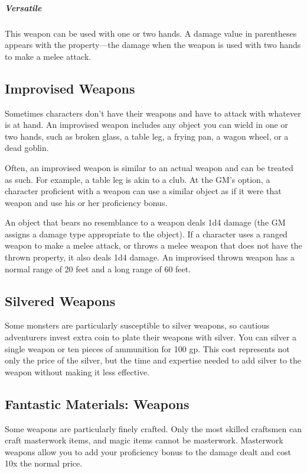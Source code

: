 \subparagraph*{Versatile} This weapon can be used with one or two hands. A damage value in parentheses appears with the property—the damage when the weapon is used with two hands to make a melee attack.

\subsection{Improvised Weapons}

Sometimes characters don't have their weapons and have to attack with whatever is at hand. An improvised weapon includes any object you can wield in one or two hands, such as broken glass, a table leg, a frying pan, a wagon wheel, or a dead goblin.

Often, an improvised weapon is similar to an actual weapon and can be treated as such. For example, a table leg is akin to a club. At the GM's option, a character proficient with a weapon can use a similar object as if it were that weapon and use his or her proficiency bonus.

An object that bears no resemblance to a weapon deals 1d4 damage (the GM assigns a damage type appropriate to the object). If a character uses a ranged weapon to make a melee attack, or throws a melee weapon that does not have the thrown property, it also deals 1d4 damage. An improvised thrown weapon has a normal range of 20 feet and a long range of 60 feet.

\subsection{Silvered Weapons}

Some monsters are particularly susceptible to silver weapons, so cautious adventurers invest extra coin to plate their weapons with silver. You can silver a single weapon or ten pieces of ammunition for 100 gp. This cost represents not only the price of the silver, but the time and expertise needed to add silver to the weapon without making it less effective.

\subsection{Fantastic Materials: Weapons}
Some weapons are particularly finely crafted. Only the most skilled craftsmen can craft masterwork items, and magic items cannot be masterwork. Masterwork weapons allow you to add your proficiency bonus to the damage dealt and cost 10x the normal price.

